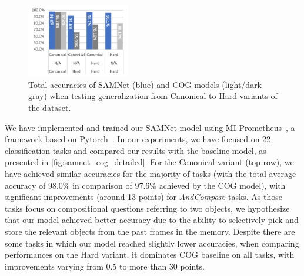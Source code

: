 \begin{figure}
	\centering
	\includegraphics[width=0.4\textwidth]{results/samnet_cog_overall_transfer.png}
	\caption{Total accuracies of SAMNet (blue) and COG models (light/dark gray) when testing generalization from Canonical to Hard variants of the dataset.}
	\label{fig:samnet_cog_overall_transfer}
\end{figure}

We have implemented and trained our SAMNet model using MI-Prometheus~\cite{kornuta2018accelerating}, a framework based on Pytorch~\cite{paszke2017automatic}. 
In our experiments, we have focused on 22 classification tasks and compared our results with the baseline model, as presented in \cref{fig:samnet_cog_detailed}.
For the Canonical variant (top row), we have achieved similar accuracies for the majority of tasks (with the total average accuracy of 98.0\% in comparison of 97.6\% achieved by the COG model), with significant improvements (around 13 points) for \textit{AndCompare} tasks.
As those tasks focus on compositional questions referring to two objects, we hypothesize that our model achieved better accuracy due to the ability to selectively pick and store the relevant objects from the past frames in the memory.
Despite there are some tasks in which our model reached slightly lower accuracies,
when comparing performances on the Hard variant, it dominates COG baseline on all tasks, with improvements varying from 0.5 to more than 30 points.

